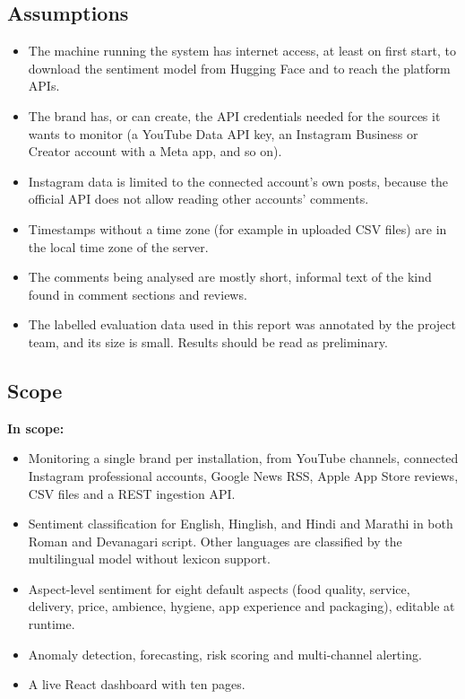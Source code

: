 \documentclass[12pt,a4paper]{report}
\begin{document}
\subsection{Assumptions}

\begin{itemize}
    \item The machine running the system has internet access, at least on first start, to download the sentiment model from Hugging Face and to reach the platform APIs.
    \item The brand has, or can create, the API credentials needed for the sources it wants to monitor (a YouTube Data API key, an Instagram Business or Creator account with a Meta app, and so on).
    \item Instagram data is limited to the connected account's own posts, because the official API does not allow reading other accounts' comments.
    \item Timestamps without a time zone (for example in uploaded CSV files) are in the local time zone of the server.
    \item The comments being analysed are mostly short, informal text of the kind found in comment sections and reviews.
    \item The labelled evaluation data used in this report was annotated by the project team, and its size is small. Results should be read as preliminary.
\end{itemize}

\subsection{Scope}

\textbf{In scope:}
\begin{itemize}
    \item Monitoring a single brand per installation, from YouTube channels, connected Instagram professional accounts, Google News RSS, Apple App Store reviews, CSV files and a REST ingestion API.
    \item Sentiment classification for English, Hinglish, and Hindi and Marathi in both Roman and Devanagari script. Other languages are classified by the multilingual model without lexicon support.
    \item Aspect-level sentiment for eight default aspects (food quality, service, delivery, price, ambience, hygiene, app experience and packaging), editable at runtime.
    \item Anomaly detection, forecasting, risk scoring and multi-channel alerting.
    \item A live React dashboard with ten pages.
\end{itemize}
\end{document}
